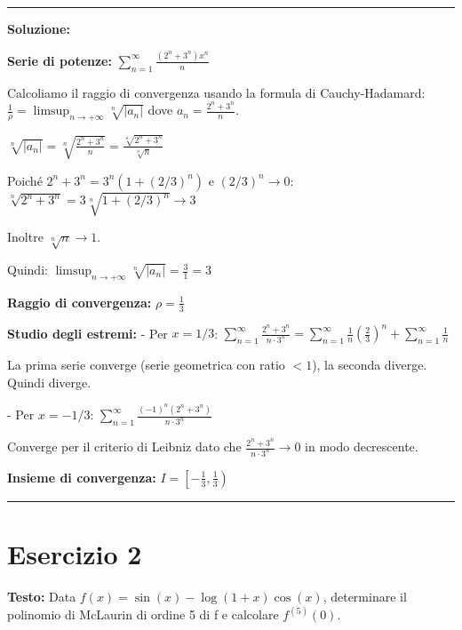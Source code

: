 \documentclass[12pt, a4paper]{article}
\newenvironment{solution}
{\par\noindent\rule{\textwidth}{0.4pt}\par\textbf{Soluzione:}\medskip\par}
{\par\rule{\textwidth}{0.4pt}\par\bigskip}
\begin{document}
\begin{solution}
\vspace{0.5cm}

\textbf{Serie di potenze:} $\displaystyle\sum_{n=1}^{\infty} \frac{(2^{n}+3^{n})x^{n}}{n}$

Calcoliamo il raggio di convergenza usando la formula di Cauchy-Hadamard:
$\frac{1}{\rho} = \limsup_{n \to +\infty} \sqrt[n]{|a_n|}$ dove $a_n = \frac{2^{n}+3^{n}}{n}$.

$\sqrt[n]{|a_n|} = \sqrt[n]{\frac{2^{n}+3^{n}}{n}} = \frac{\sqrt[n]{2^{n}+3^{n}}}{\sqrt[n]{n}}$

Poiché $2^n + 3^n = 3^n(1 + (2/3)^n)$ e $(2/3)^n \to 0$:
$\sqrt[n]{2^{n}+3^{n}} = 3 \sqrt[n]{1 + (2/3)^n} \to 3$

Inoltre $\sqrt[n]{n} \to 1$.

Quindi: $\limsup_{n \to +\infty} \sqrt[n]{|a_n|} = \frac{3}{1} = 3$

\textbf{Raggio di convergenza:} $\rho = \frac{1}{3}$

\textbf{Studio degli estremi:}
- Per $x = 1/3$: $\sum_{n=1}^{\infty} \frac{2^{n}+3^{n}}{n \cdot 3^n} = \sum_{n=1}^{\infty} \frac{1}{n}\left(\frac{2}{3}\right)^n + \sum_{n=1}^{\infty} \frac{1}{n}$
  
  La prima serie converge (serie geometrica con ratio $< 1$), la seconda diverge. Quindi diverge.

- Per $x = -1/3$: $\sum_{n=1}^{\infty} \frac{(-1)^n(2^{n}+3^{n})}{n \cdot 3^n}$
  
  Converge per il criterio di Leibniz dato che $\frac{2^{n}+3^{n}}{n \cdot 3^n} \to 0$ in modo decrescente.

\textbf{Insieme di convergenza:} $I = \left[-\frac{1}{3}, \frac{1}{3}\right)$
\end{solution}

\newpage

\section*{Esercizio 2}

\textbf{Testo:} Data $f(x) = \sin(x) - \log(1+x)\cos(x)$, determinare il polinomio di McLaurin di ordine 5 di f e calcolare $f^{(5)}(0)$.
\end{document}
